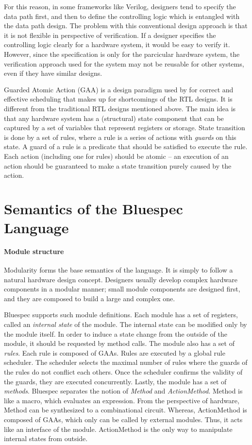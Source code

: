 For this reason, in some frameworks like Verilog, designers tend to
specify the data path first, and then to define the controlling logic
which is entangled with the data path design. The problem with this
conventional design approach is that it is not flexible in perspective
of verification. If a designer specifies the controlling logic clearly
for a hardware system, it would be easy to verify it. However, since
the specification is only for the parcicular hardware system, the
verification approach used for the system may not be reusable for
other systems, even if they have similar designs.

Guarded Atomic Action (GAA) is a design paradigm used by \Bluespec{}
for correct and effective scheduling that makes up for shortcomings of
the RTL designs. It is different from the traditional RTL designs
mentioned above. The main idea is that any hardware system has a
(structural) state component that can be captured by a set of
variables that represent registers or storage. State transition is
done by a set of rules, where a rule is a series of actions with
\emph{guards} on this state. A guard of a rule is a predicate that
should be satisfied to execute the rule. Each action (including one
for rules) should be atomic -- an execution of an action should be
guaranteed to make a state transition purely caused by the action.

\section{Semantics of the Bluespec Language}
\label{sec:bluespec-semantics}

\paragraph{Module structure}

Modularity forms the base semantics of the \Bluespec{} language. It is
simply to follow a natural hardware design concept. Designers usually
develop complex hardware components in a modular manner; small module
components are designed first, and they are composed to build a large
and complex one.

Bluespec supports such module definitions. Each module has a set of
registers, called an \emph{internal state} of the module. The internal
state can be modified only by the module itself. In order to induce a
state change from the outside of the module, it should be requested by
method calls. The module also has a set of \emph{rules}. Each rule is
composed of GAAs. Rules are executed by a global rule scheduler. The
scheduler selects the maximal number of rules where the guards of the
rules do not conflict each others. Once the scheduler confirms the
validity of the guards, they are executed concurrently. Lastly, the
module has a set of \emph{methods}. Bluespec separates the notion of
\emph{Method} and \emph{ActionMethod}. Method is like a macro, which
evaluates an expression. From the perspective of hardware, Method can
be synthesized to a combinational circuit.  Whereas, ActionMethod is
composed of GAAs, which only can be called by external modules. Thus,
it acts like an interface of the module. ActionMethod is the only way
to manipulate internal states from outside.

